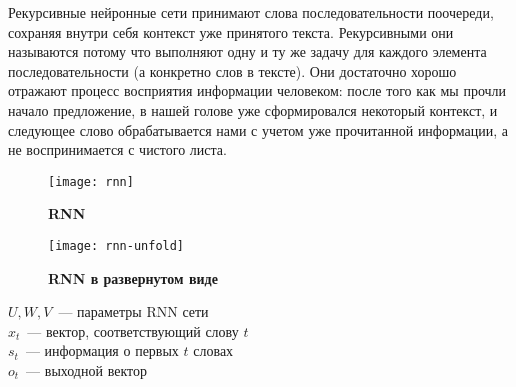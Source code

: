 Рекурсивные нейронные сети принимают слова последовательности поочереди, сохраняя внутри себя контекст уже принятого текста. Рекурсивными они называются потому что выполняют одну и ту же задачу для каждого элемента последовательности (а конкретно слов в тексте). Они достаточно хорошо отражают процесс восприятия информации человеком: после того как мы прочли начало предложение, в нашей голове уже сформировался некоторый контекст, и следующее слово обрабатывается нами с учетом уже прочитанной информации, а не воспринимается с чистого листа.

\begin{figure}[h]
\texttt{[image: rnn]}
\caption{\textbf{RNN}}
\label{fig:figure1}
\end{figure}

\begin{figure}[h]
\texttt{[image: rnn-unfold]}
\caption{\textbf{RNN в развернутом виде}}
\label{fig:figure2}
\end{figure}

\noindent $U, W, V$~--- параметры RNN сети\\
$x_t$~--- вектор, соответствующий слову $t$ \\
$s_t$~--- информация о первых $t$ словах \\
$o_t$~--- выходной вектор

